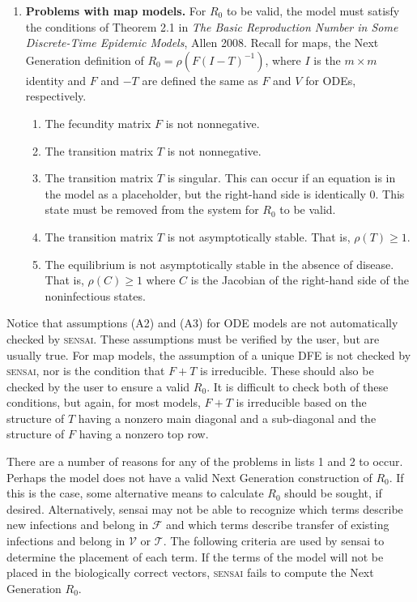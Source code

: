 \documentclass[12pt]{article}
\newcommand{\sensai}{\textsc{sensai}}
\begin{document}
\begin{enumerate}
\begin{enumerate}
 \end{enumerate}

\item \textbf{Problems with map models.}  For $R_0$ to be valid, the model must satisfy the conditions of Theorem 2.1 in \textit{The Basic Reproduction Number in Some Discrete-Time Epidemic Models}, Allen 2008.  Recall for maps, the Next Generation definition of $R_0 = \rho(F(I-T)^{-1})$, where $I$ is the $m\times m$ identity and $F$ and $-T$ are defined the same as $F$ and $V$ for ODEs, respectively.

 \begin{enumerate}

  \item The fecundity matrix $F$ is not nonnegative.
  \item The transition matrix $T$ is not nonnegative.
  \item The transition matrix $T$ is singular.  This can occur if an equation is in the model as a placeholder, but the right-hand side is identically 0.  This state must be removed from the system for $R_0$ to be valid.
  \item The transition matrix $T$ is not asymptotically stable.  That is, $\rho(T) \geq 1$.
  \item The equilibrium is not asymptotically stable in the absence of disease.  That is, $\rho(C) \geq 1$ where $C$ is the Jacobian of the right-hand side of the noninfectious states.

 \end{enumerate}

\end{enumerate}

Notice that assumptions (A2) and (A3) for ODE models are not automatically checked by {\sensai}.  These assumptions must be verified by the user, but are usually true.  For map models, the assumption of a unique DFE is not checked by {\sensai}, nor is the condition that $F+T$ is irreducible.  These should also be checked by the user to ensure a valid $R_0$.  It is difficult to check both of these conditions, but again, for most models, $F+T$ is irreducible based on the structure of $T$ having a nonzero main diagonal and a sub-diagonal and the structure of $F$ having a nonzero top row.

There are a number of reasons for any of the problems in lists 1 and 2 to occur.  Perhaps the model does not have a valid Next Generation construction of $R_0$.  If this is the case, some alternative means to calculate $R_0$ should be sought, if desired.  Alternatively, {\sc sensai} may not be able to recognize which terms describe new infections and belong in $\mathcal{F}$ and which terms describe transfer of existing infections and belong in $\mathcal{V}$ or $\mathcal{T}$.  The following criteria are used by {\sc sensai} to determine the placement of each term.  If the terms of the model will not be placed in the biologically correct vectors, {\sensai} fails to compute the Next Generation $R_0$.
\end{document}
